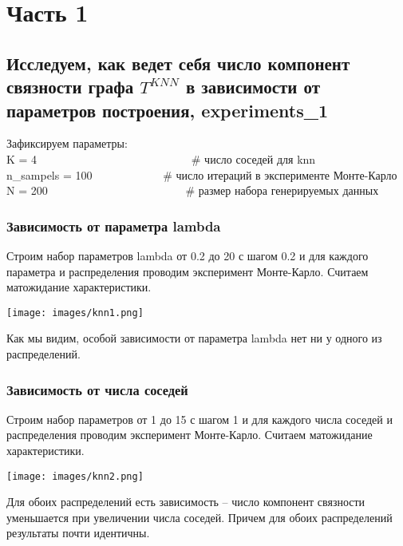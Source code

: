 \documentclass[a4paper,12pt]{article}
\begin{document}
\section{Часть 1}

\subsection{Исследуем, как ведет себя число компонент связности графа $T^{KNN}$ в зависимости от параметров построения, experiments\_1}
Зафиксируем параметры:\\
K = 4   \ \ \ \     \ \ \  \ \ \ \ \  \ \ \ \ \  \ \ \ \ \ \ \ \ \  \   # число соседей для knn\\
n\_sampels = 100  \ \ \ \ \ \ \ \ \ \ \ \   # число итераций в эксперименте Монте-Карло\\
N = 200  \ \ \ \ \ \ \ \ \ \  \ \ \ \ \ \ \ \ \ \ \ \ \ \          # размер набора генерируемых данных\\




\subsubsection*{Зависимость от параметра lambda}
Строим набор параметров lambda от 0.2 до 20 с шагом 0.2 и для каждого параметра и распределения проводим эксперимент Монте-Карло. Считаем матожидание характеристики.

\begin{center}
\texttt{[image: images/knn1.png]} \end{center}

Как мы видим, особой зависимости от параметра lambda нет ни у одного из распределений.


\subsubsection*{Зависимость от числа соседей}

Строим набор параметров от 1 до 15 с шагом 1 и для каждого числа соседей и распределения проводим эксперимент Монте-Карло. Считаем матожидание характеристики.

\begin{center}
\texttt{[image: images/knn2.png]} \end{center}

Для обоих распределений есть зависимость -- число компонент связности уменьшается при увеличении числа соседей. Причем для обоих распределений результаты почти идентичны.
\end{document}
